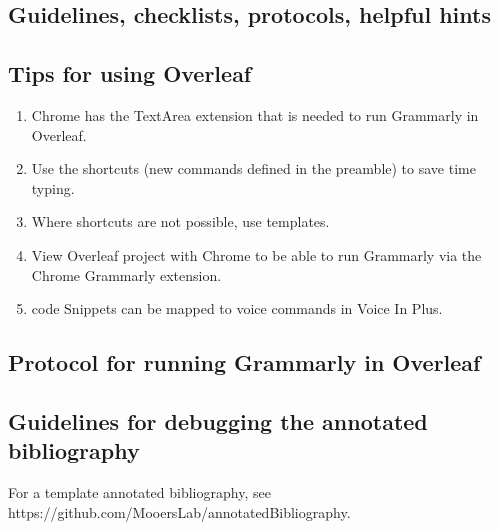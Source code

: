 \documentclass[10pt,letterpaper]{article}
\newcommand{\be}{\begin{enumerate}}
\newcommand{\ee}{\end{enumerate}}
\begin{document}
\begin{description}
\section{Guidelines, checklists, protocols, helpful hints}
\label{sec:guides}

\subsection{Tips for using Overleaf}
\label{subsec:guides:overleaf}


\be
\item Chrome has the TextArea extension that is needed to run Grammarly in Overleaf.
\item Use the shortcuts (new commands defined in the preamble) to save time typing.
\item Where shortcuts are not possible, use templates.
\item View Overleaf project with Chrome to be able to run Grammarly via the Chrome Grammarly extension.
\item code Snippets can be mapped to voice commands in Voice In Plus.
\ee 


\subsection{Protocol for running Grammarly in Overleaf}
\label{subsec:guides:grammarlyInoverleaf}



\subsection{Guidelines for debugging the annotated bibliography} 
\label{subsec:guides:annotDebug}

For a template annotated bibliography, see https://github.com/MooersLab/annotatedBibliography.


\end{description}
\end{document}
